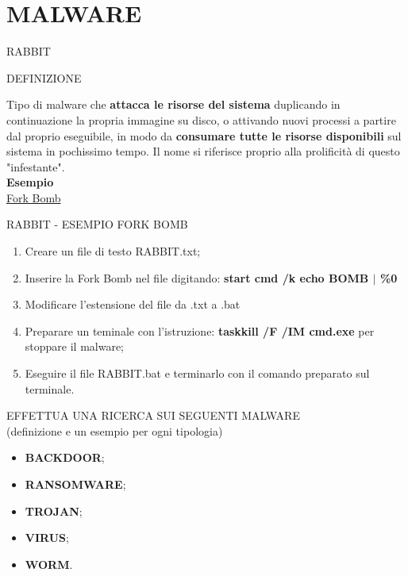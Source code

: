 \documentclass[aspectratio=1610]{beamer}
\begin{document}
\section{MALWARE}

\begin{frame}{RABBIT}
    \begin{alertblock}{DEFINIZIONE}
        \begin{minipage}{0.98\linewidth}
            \justifying
            Tipo di malware che \textbf{attacca le risorse del sistema} duplicando in continuazione la propria 
            immagine su disco, o attivando nuovi processi a partire dal proprio eseguibile, 
            in modo da \textbf{consumare tutte le risorse disponibili} sul sistema in pochissimo tempo. 
            Il nome si riferisce proprio alla prolificità di questo "infestante".\\
            \bigskip
            \tiny{\textbf{Esempio}}\\
            \tiny{\href{https://it.wikipedia.org/wiki/Fork_bomb}{Fork Bomb}}
        \end{minipage}
    \end{alertblock}
\end{frame}

\begin{frame}{RABBIT - ESEMPIO FORK BOMB}
    \begin{enumerate}
        \item Creare un file di testo RABBIT.txt;
        \pause
        \item Inserire la Fork Bomb nel file digitando: \textbf{start cmd /k echo BOMB \textbf{$\mid$} \%0}
        \pause
        \item Modificare l’estensione del ﬁle da .txt a .bat
        \pause
        \item Preparare un teminale con l'istruzione: \textbf{taskkill /F /IM cmd.exe} per stoppare il malware;
        \pause
        \item Eseguire il file RABBIT.bat e terminarlo con il comando preparato sul terminale.
    \end{enumerate}                        
\end{frame}

\begin{frame}{EFFETTUA UNA RICERCA SUI SEGUENTI MALWARE\\(definizione e un esempio per ogni tipologia)}
    \begin{itemize}
        \item \textbf{BACKDOOR};
        \item \textbf{RANSOMWARE};
        \item \textbf{TROJAN};
        \item \textbf{VIRUS};
        \item \textbf{WORM}.
    \end{itemize}                        
\end{frame}
\end{document}
